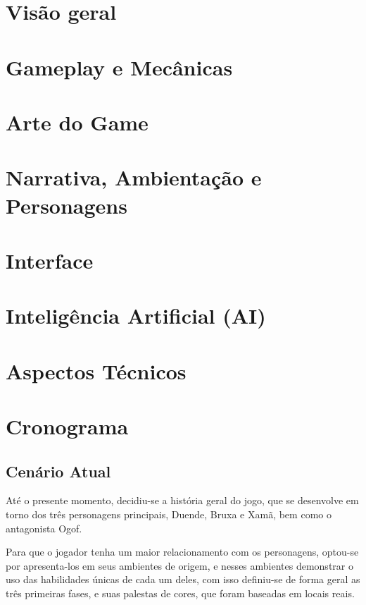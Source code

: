 \chapter{Visão geral}


\chapter{Gameplay e Mecânicas}


\chapter{Arte do Game}


\chapter{Narrativa, Ambientação e Personagens}


\chapter{Interface}


\chapter{Inteligência Artificial (AI)}


\chapter{Aspectos Técnicos}


\chapter{Cronograma}

\section{Cenário Atual}

Até o presente momento, decidiu-se a história geral do jogo, que se desenvolve em torno dos três personagens principais, Duende, Bruxa e Xamã, bem como o antagonista Ogof.

Para que o jogador tenha um maior relacionamento com os personagens, optou-se por apresenta-los em seus ambientes de origem, e nesses ambientes demonstrar o uso das habilidades únicas de cada um deles, com isso definiu-se de forma geral as três primeiras fases, e suas palestas de cores, que foram baseadas em locais reais. 

